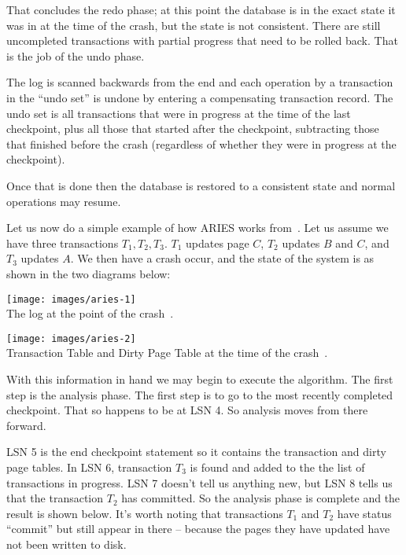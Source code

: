 \documentclass[a4paper]{report}
\begin{document}
That concludes the redo phase; at this point the database is in the exact state it was in at the time of the crash, but the state is not consistent. There are still uncompleted transactions with partial progress that need to be rolled back. That is the job of the undo phase.

The log is scanned backwards from the end and each operation by a transaction in the ``undo set'' is undone by entering a compensating transaction record. The undo set is all transactions that were in progress at the time of the last checkpoint, plus all those that started after the checkpoint, subtracting those that finished before the crash (regardless of whether they were in progress at the checkpoint). 

Once that is done then the database is restored to a consistent state and normal operations may resume. 

Let us now do a simple example of how ARIES works from~\cite{fds}. Let us assume we have three transactions $T_{1}, T_{2}, T_{3}$. $T_{1}$ updates page $C$, $T_{2}$ updates $B$ and $C$, and $T_{3}$ updates $A$. We then have a crash occur, and the state of the system is as shown in the two diagrams below:

\begin{center}
\texttt{[image: images/aries-1]}\\
The log at the point of the crash~\cite{fds}.
\end{center}

\begin{center}
\texttt{[image: images/aries-2]}\\
Transaction Table and Dirty Page Table at the time of the crash~\cite{fds}.
\end{center}

With this information in hand we may begin to execute the algorithm. The first step is the analysis phase. The first step is to go to the most recently completed checkpoint. That so happens to be at LSN 4. So analysis moves from there forward. 

LSN 5 is the end checkpoint statement so it contains the transaction and dirty page tables. In LSN 6, transaction $T_{3}$ is found and added to the the list of transactions in progress. LSN 7 doesn't tell us anything new, but LSN 8 tells us that the transaction $T_{2}$ has committed. So the analysis phase is complete and the result is shown below. It's worth noting that transactions $T_{1}$ and $T_{2}$ have status ``commit'' but still appear in there -- because the pages they have updated have not been written to disk. 
\end{document}
